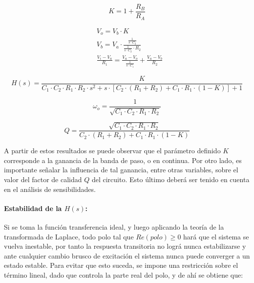 \begin{equation}
K = 1 + \frac{R_B}{R_A}
\label{eq:sallen_key_k}
\end{equation}

\begin{align*}
& V_o = V_b \cdot K \\
& V_b = V_a \cdot \frac{\frac{1}{s \cdot C_2}}{\frac{1}{s \cdot C_2} \cdot R_2} \\
& \frac{V_i - V_a}{R_1} = \frac{V_a - V_o}{\frac{1}{s \cdot C_1}} + \frac{V_a - V_b}{R_2}
\end{align*}

\begin{equation}
H(s) = \frac{K}{C_1 \cdot C_2 \cdot R_1 \cdot R_2 \cdot s^{2} + s \cdot \left[ C_2 \cdot (R_1 + R_2) + C_1 \cdot R_1 \cdot (1 - K) \right] + 1}
\label{eq:sallen_key_h}
\end{equation}

\begin{equation}
\omega_o = \frac{1}{\sqrt{C_1 \cdot C_2 \cdot R_1 \cdot R_2}}
\label{eq:sallen_key_wo}
\end{equation}

\begin{equation}
Q = \frac{\sqrt{C_1 \cdot C_2 \cdot R_1 \cdot R_2}}{C_2 \cdot (R_1 + R_2) + C_1 \cdot R_1 \cdot (1 - K)}
\label{eq:sallen_key_q}
\end{equation}

A partir de estos resultados se puede observar que el par\'ametro definido $K$ corresponde a la ganancia de la banda de paso, o en continua. Por otro lado, es importante
se\~nalar la influencia de tal ganancia, entre otras variables, sobre el valor del factor de calidad $Q$ del circuito. Esto \'ultimo deber\'a ser tenido en cuenta en el an\'alisis de sensibilidades.

\paragraph{Estabilidad de la $H(s)$:} Si se toma la funci\'on transferencia ideal, y luego aplicando la teor\'ia de la transformada de Laplace, todo polo tal que $Re(polo) \geq 0$ har\'a que el sistema se vuelva inestable,
por tanto la respuesta transitoria no logr\'a nunca estabilizarse y ante cualquier cambio brusco de excitaci\'on el sistema nunca puede converger a un estado estable. Para evitar que esto suceda, se impone una restricci\'on sobre el t\'ermino lineal,
dado que controla la parte real del polo, y de ah\'i se obtiene que:

